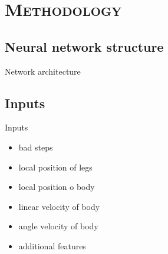 \documentclass[xcolor=x11names,compress]{beamer}
\renewcommand{\(}{\begin{columns}}
\renewcommand{\)}{\end{columns}}
\newcommand{\<}[1]{\begin{column}{#1}}
\renewcommand{\>}{\end{column}}
\begin{document}
\section{\scshape Methodology}
\subsection{Neural network structure}
\begin{frame}{Network architecture}
{
\begin{frame}
     \end{frame}
}

\end{frame}
\subsection{Inputs}
\begin{frame}{Inputs}

\begin{itemize}
\item bad steps
\item local position of legs
\item local position o body
\item linear velocity of body
\item angle velocity of body
\item additional features

\end{itemize}

\end{frame}
\end{document}
